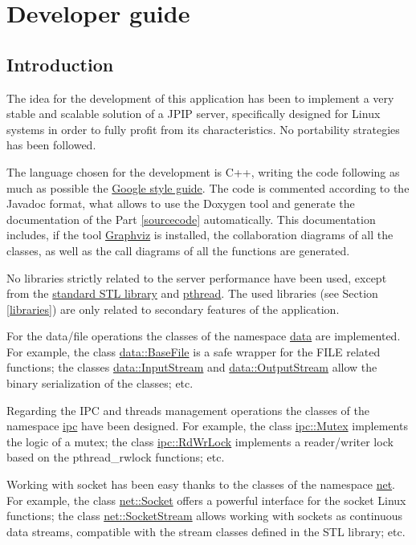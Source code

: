 \chapter{Developer guide}

\section{Introduction}

The idea for the development of this application has been to implement a very
stable and scalable solution of a JPIP server, specifically designed for Linux
systems in order to fully profit from its characteristics. No portability
strategies has been followed.

The language chosen for the development is C++, writing the code following  as
much as possible the
\href{http://google-styleguide.googlecode.com/svn/trunk/cppguide.xml}{Google
style guide}. The code is commented according to the Javadoc format, what
allows to use the Doxygen tool and generate the documentation of the
Part \ref{sourcecode} automatically. This documentation includes, if the tool
\href{http://www.graphviz.org/}{Graphviz} is installed, the collaboration diagrams 
of all the classes, as well as the call diagrams of all the functions are 
generated.

No libraries strictly related to the server performance have been used, except
from the \href{http://www.sgi.com/tech/stl/}{standard STL library} and 
\href{https://computing.llnl.gov/tutorials/pthreads/}{pthread}. 
The used libraries (see Section \ref{libraries}) are only related to secondary 
features of the application. 

For the data/file
operations the classes of the namespace \hyperlink{namespacedata}{data} 
are implemented. For example, 
the class \hyperlink{classdata_1_1BaseFile}{data::BaseFile} is a 
safe wrapper for the
FILE related functions; the classes \hyperlink{classdata_1_1InputStream}
{data::InputStream} and \hyperlink{classdata_1_1OutputStream}
{data::OutputStream} allow the binary serialization of the classes;
etc. 

Regarding the IPC and threads management operations the classes of the
namespace \hyperlink{namespaceipc}{ipc} have been designed. For example,
the class \hyperlink{classipc_1_1Mutex}{ipc::Mutex} implements the
logic of a mutex; the class \hyperlink{classipc_1_1RdWrLock}
{ipc::RdWrLock} implements a reader/writer lock based on the 
pthread\_rwlock functions; etc.

Working with socket has been easy thanks to the classes of the namespace
\hyperlink{namespacenet}{net}. For example, the class 
\hyperlink{classnet_1_1Socket}{net::Socket} offers a powerful interface
for the socket Linux functions; the class \hyperlink{classnet_1_1SocketStream}
{net::SocketStream} allows working with sockets as continuous data streams,
compatible with the stream classes defined in the STL library; etc.

